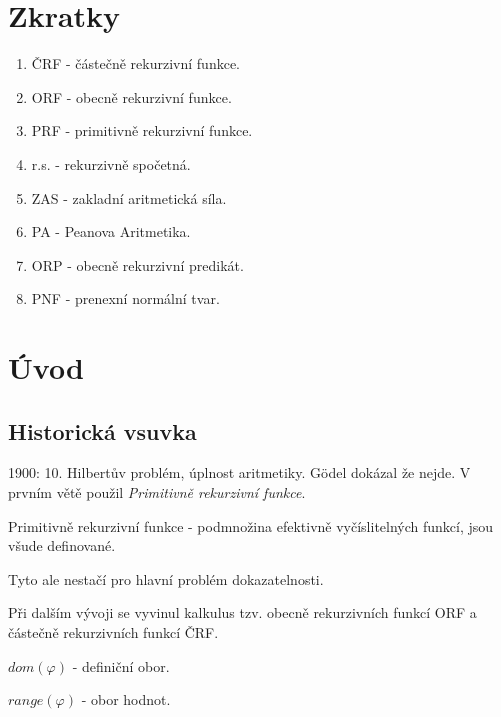\section{\texorpdfstring{Zkratky}{Zkratky}}
\vspace{5mm}
\large

\begin{enumerate}
	\item ČRF - částečně rekurzivní funkce.
	\item ORF - obecně rekurzivní funkce.
	\item PRF - primitivně rekurzivní funkce.
	\item r.s. - rekurzivně spočetná.
	\item ZAS - zakladní aritmetická síla.
	\item PA - Peanova Aritmetika.
	\item ORP - obecně rekurzivní predikát.
	\item PNF - prenexní normální tvar.
\end{enumerate}

\section{\texorpdfstring{Úvod}{Úvod}}
\vspace{5mm}
\large


\subsection{Historická vsuvka}

1900: 10. Hilbertův problém, úplnost aritmetiky.
G\"{o}del dokázal že nejde. V prvním větě použil \emph{Primitivně rekurzivní funkce}.

\begin{definition}
	Primitivně rekurzivní funkce - podmnožina efektivně vyčíslitelných funkcí, jsou všude definované.
\end{definition}

Tyto ale nestačí pro hlavní problém dokazatelnosti.

Při dalším vývoji se vyvinul kalkulus tzv. obecně rekurzivních funkcí ORF a částečně rekurzivních funkcí ČRF.

\begin{notation}
	$dom(\varphi)$ - definiční obor.
\end{notation}
\begin{notation}
	$range(\varphi)$ - obor hodnot.
\end{notation}

